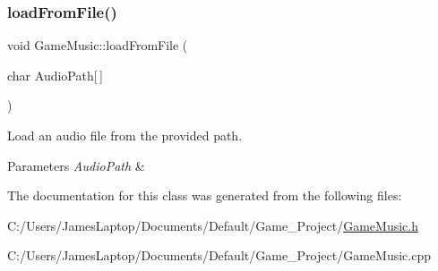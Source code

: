 \subsubsection{\texorpdfstring{load\+From\+File()}{loadFromFile()}}
{\footnotesize\ttfamily void Game\+Music\+::load\+From\+File (\begin{DoxyParamCaption}\item[{char}]{Audio\+Path\mbox{[}$\,$\mbox{]} }\end{DoxyParamCaption})}



Load an audio file from the provided path. 


\begin{DoxyParams}{Parameters}
{\em Audio\+Path} & \\
\hline
\end{DoxyParams}


The documentation for this class was generated from the following files\+:\begin{DoxyCompactItemize}
\item 
C\+:/\+Users/\+James\+Laptop/\+Documents/\+Default/\+Game\+\_\+\+Project/\hyperlink{_game_music_8h}{Game\+Music.\+h}\item 
C\+:/\+Users/\+James\+Laptop/\+Documents/\+Default/\+Game\+\_\+\+Project/Game\+Music.\+cpp\end{DoxyCompactItemize}
